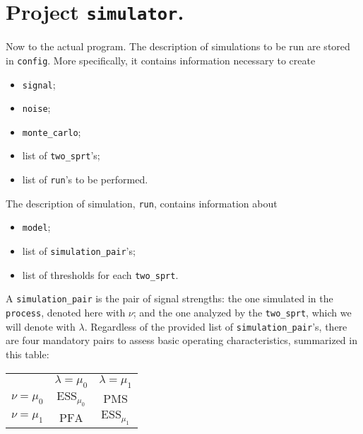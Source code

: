 \documentclass[12pt]{article}
\newcommand{\ESS}{\mathrm{ESS}}
\newcommand{\PFA}{\mathrm{PFA}}
\newcommand{\PMS}{\mathrm{PMS}}
\begin{document}


\section*{Project \texttt{simulator}.}

Now to the actual program. The description of simulations to be run are stored in \texttt{config}.
More specifically, it contains information necessary to create
\begin{itemize}
    \item \texttt{signal};
    \item \texttt{noise};
    \item \texttt{monte\_carlo};
    \item list of \texttt{two\_sprt}'s;
    \item list of \texttt{run}'s to be performed. 
\end{itemize}
%
The description of simulation, \texttt{run}, contains information about
\begin{itemize}
    \item \texttt{model};
    \item list of \texttt{simulation\_pair}'s;
    \item list of thresholds for each \texttt{two\_sprt}.
\end{itemize}

A \texttt{simulation\_pair} is the pair of signal strengths: the one simulated in the \texttt{process}, denoted here with $\nu $; and the one analyzed by the \texttt{two\_sprt}, which we will denote with $\lambda $.
Regardless of the provided list of \texttt{simulation\_pair}'s, there are four mandatory pairs to assess basic operating characteristics, summarized in this table:
\begin{center}
    \renewcommand{\arraystretch}{1.4}
    \begin{tabular}{ r | c | c | }
        \multicolumn{1}{r}{}
            & \multicolumn{1}{c}{$\lambda = \mu _0$}
            & \multicolumn{1}{c}{$\lambda = \mu _1$}           \\ \cline{2-3}
        $\nu = \mu _0$  & $\ESS _{\mu _0}$  & $\PMS $          \\ \cline{2-3}
        $\nu = \mu _1$  & $\PFA $           & $\ESS _{\mu _1}$ \\ \cline{2-3}
    \end{tabular}
\end{center}
\end{document}
